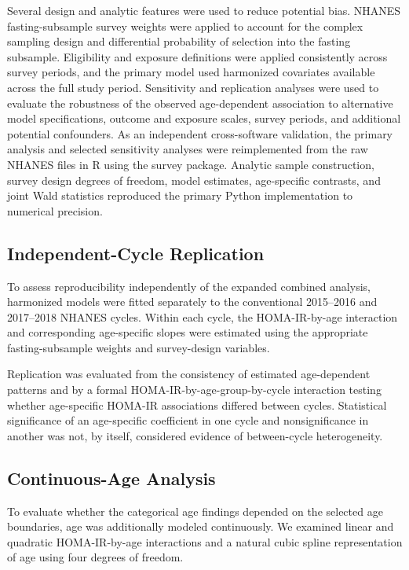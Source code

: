 \documentclass[11pt]{article}
\begin{document}
Several design and analytic features were used to reduce potential bias. NHANES fasting-subsample survey weights were applied to account for the complex sampling design and differential probability of selection into the fasting subsample. Eligibility and exposure definitions were applied consistently across survey periods, and the primary model used harmonized covariates available across the full study period. Sensitivity and replication analyses were used to evaluate the robustness of the observed age-dependent association to alternative model specifications, outcome and exposure scales, survey periods, and additional potential confounders. As an independent cross-software validation, the primary analysis and selected sensitivity analyses were reimplemented from the raw NHANES files in R using the survey package. Analytic sample construction, survey design degrees of freedom, model estimates, age-specific contrasts, and joint Wald statistics reproduced the primary Python implementation to numerical precision.

\subsection{Independent-Cycle Replication}

To assess reproducibility independently of the expanded combined analysis,
harmonized models were fitted separately to the conventional 2015--2016
and 2017--2018 NHANES cycles. Within each cycle, the HOMA-IR-by-age
interaction and corresponding age-specific slopes were estimated using the
appropriate fasting-subsample weights and survey-design variables.

Replication was evaluated from the consistency of estimated age-dependent
patterns and by a formal HOMA-IR-by-age-group-by-cycle interaction testing
whether age-specific HOMA-IR associations differed between cycles.
Statistical significance of an age-specific coefficient in one cycle and
nonsignificance in another was not, by itself, considered evidence of
between-cycle heterogeneity.


\subsection{Continuous-Age Analysis}

To evaluate whether the categorical age findings depended on the selected
age boundaries, age was additionally modeled continuously. We examined
linear and quadratic HOMA-IR-by-age interactions and a natural cubic spline
representation of age using four degrees of freedom.
\end{document}
